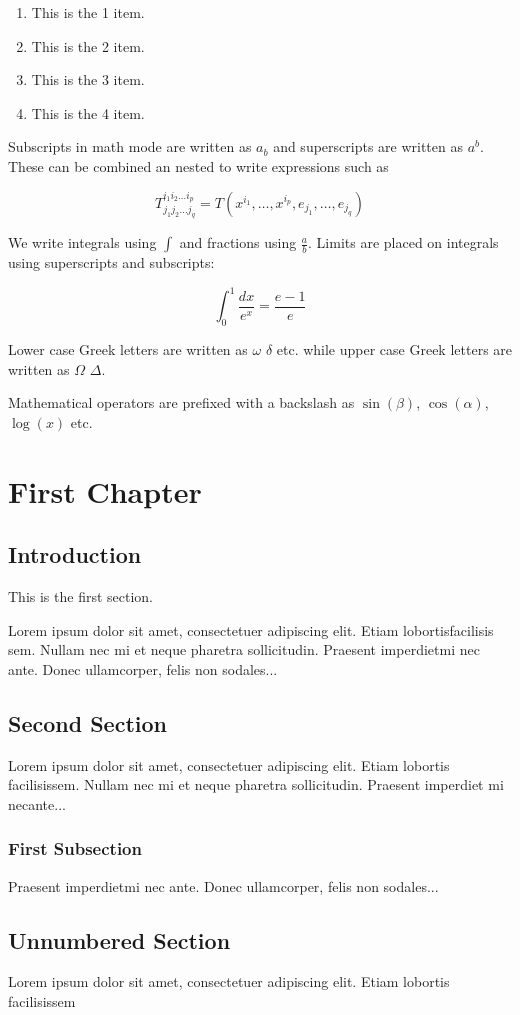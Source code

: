 \documentclass[12pt, a4paper ]{article}
\begin{document}
\begin{enumerate}
  \item This is the 1 item.
  \item This is the 2 item.
  \item This is the 3 item.
  \item This is the 4 item.
\end{enumerate}


Subscripts in math mode are written as $a_b$ and superscripts are written as $a^b$. These can be combined an nested to write expressions such as

\[ T^{i_1 i_2 \dots i_p}_{j_1 j_2 \dots j_q} = T(x^{i_1},\dots,x^{i_p},e_{j_1},\dots,e_{j_q}) \]
 
We write integrals using $\int$ and fractions using $\frac{a}{b}$. Limits are placed on integrals using superscripts and subscripts:

\[ \int_0^1 \frac{dx}{e^x} =  \frac{e-1}{e} \]

Lower case Greek letters are written as $\omega$ $\delta$ etc. while upper case Greek letters are written as $\Omega$ $\Delta$.

Mathematical operators are prefixed with a backslash as $\sin(\beta)$, $\cos(\alpha)$, $\log(x)$ etc.



\chapter{First Chapter}

\section{Introduction}

This is the first section.

Lorem  ipsum  dolor  sit  amet,  consectetuer  adipiscing  
elit.   Etiam  lobortisfacilisis sem.  Nullam nec mi et 
neque pharetra sollicitudin.  Praesent imperdietmi nec ante. 
Donec ullamcorper, felis non sodales...

\section{Second Section}

Lorem ipsum dolor sit amet, consectetuer adipiscing elit.  
Etiam lobortis facilisissem.  Nullam nec mi et neque pharetra 
sollicitudin.  Praesent imperdiet mi necante...

\subsection{First Subsection}
Praesent imperdietmi nec ante. Donec ullamcorper, felis non sodales...

\section*{Unnumbered Section}
Lorem ipsum dolor sit amet, consectetuer adipiscing elit.  
Etiam lobortis facilisissem
\end{document}
